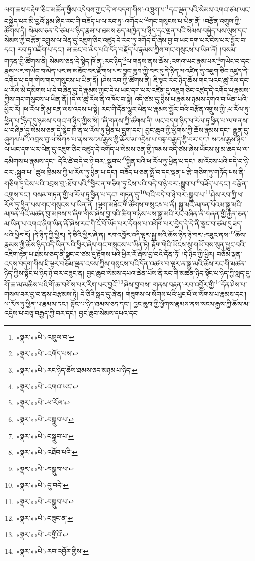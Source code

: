 ལག་ཆས་བརྡེག་ཅིང་མཚོན་གྱིས་འདེབས་ཀྱང་དེ་ལ་བདག་གིས་:འཁྲུག་པ་\footnote{«སྣར་»«པེ་»འཁྲུལ་བ་}དང་ལྡན་པའི་སེམས་འགའ་ཙམ་ཡང་བསྐྱེད་པར་མི་བྱའོ་སྙམ་ཞིང་རང་གི་བཟོད་པ་ལ་རབ་ཏུ་:འགོད་པ་\footnote{«སྣར་»«པེ་»འགོད་པས་}གང་གསུངས་པ་ཡིན་ནོ། །བརྩོན་འགྲུས་ཀྱི་ཚོགས་ནི། སེམས་ཅན་དེ་ཙམ་པ་ཉིད་རྣམ་པ་ཐམས་ཅད་མཁྱེན་པ་ཉིད་དང་ལྡན་པའི་སེམས་བསྐྱེད་པས་ལུས་དང་སེམས་ཀྱི་བརྩོན་འགྲུས་ལ་ལེན་དུ་འཇུག་ཅིང་འཛུད་དེ་རབ་ཏུ་འགོད་དོ་ཞེས་བྱ་བ་ཡང་དག་པར་ངེས་པར་སྦྱོར་བ་དང་། རབ་ཏུ་འཇོག་པ་དང་། མ་ཚང་བ་མེད་པའི་དོན་བརྗོད་པ་རྣམས་ཀྱིས་གང་གསུངས་པ་ཡིན་ནོ། །བསམ་གཏན་གྱི་ཚོགས་ནི། སེམས་ཅན་དེ་སྙེད་ཁོ་ན་:རང་ཉིད་\footnote{«སྣར་»«པེ་»རང་ཉིད་ཆོས་ཐམས་ཅད་མཉམ་པ་ཉིད་}ལ་གནས་ནས་ཆོས་:འགའ་ཡང་རྣམ་པར་\footnote{«སྣར་»«པེ་»འགའ་ཡང་}གཡེང་བ་དང་རྣམ་པར་གཡེང་བ་མེད་པར་མ་མཐོང་བར་རྫོགས་པར་བྱང་ཆུབ་ཀྱི་བར་དུ་དེ་ཉིད་ལ་འཛིན་དུ་འཇུག་ཅིང་འཛུད་དེ་འགོད་པ་དག་གིས་གང་གསུངས་པ་ཡིན་ནོ། །ཤེས་རབ་ཀྱི་ཚོགས་ནི། ཇི་ལྟར་རང་ཉིད་ཆོས་གང་ལའང་ཚུ་རོལ་དང་ཕ་རོལ་མི་དམིགས་པ་དེ་བཞིན་དུ་དེ་རྣམས་ཀྱང་དེ་ལ་ཡང་དག་པར་འཛིན་དུ་འཇུག་ཅིང་འཛུད་དེ་འགོད་པ་རྣམས་ཀྱིས་གང་གསུངས་པ་ཡིན་ནོ། །དེ་ལ་ཚུ་རོལ་ནི་འཁོར་བ་སྟེ། འདི་ཙམ་དུ་བྱིས་པ་རྣམས་ཉམས་དགའ་བ་ཡིན་པའི་ཕྱིར་རོ། །ཕ་རོལ་ནི་མྱ་ངན་ལས་འདས་པ་སྟེ། རང་གི་དོན་ལྷུར་ལེན་པ་རྣམས་སྦྱོར་བའི་བརྩོན་འགྲུས་ཀྱི་:ཕ་རོལ་ཏུ་ཕྱིན་པ་\footnote{«སྣར་»«པེ་»ཕ་རོལ་}ཉིད་དུ་ཉམས་དགའ་བ་ཉིད་ཀྱིས་སོ། །ཞི་གནས་ཀྱི་ཚོགས་ནི། ཡང་བདག་ཉིད་ཕ་རོལ་ཏུ་ཕྱིན་པ་ལ་གནས་པ་བཞིན་དུ་སེམས་ཅན་དེ་སྙེད་ཁོ་ན་ཕ་རོལ་ཏུ་ཕྱིན་པ་དྲུག་དང་། བྱང་ཆུབ་ཀྱི་ཕྱོགས་ཀྱི་ཆོས་རྣམས་དང་། རྒྱུན་དུ་ཞུགས་པའི་འབྲས་བུ་ལ་སོགས་པ་ནས་སངས་རྒྱས་ཀྱི་ཆོས་མ་འདྲེས་པ་བཅྭ་བརྒྱད་ཀྱི་བར་དང་། སངས་རྒྱས་ཉིད་ལ་ཡང་དག་པར་ལེན་དུ་འཇུག་ཅིང་འཛུད་དེ་འགོད་པ་སེམས་ཅན་གྱི་ཁམས་འདི་ཙམ་ཞེས་ཡོངས་སུ་མ་ཆད་པ་ལ་དམིགས་པ་རྣམས་དང་། དེའི་ཚེ་བདེ་བ་ཉེ་བར་:སྒྲུབ་པ་\footnote{«སྣར་»«པེ་»བསྒྲུབ་པ་}སྦྱིན་པའི་ཕ་རོལ་ཏུ་ཕྱིན་པ་དང་། མ་འོངས་པའི་བདེ་བ་ཉེ་བར་:སྒྲུབ་པ་\footnote{«སྣར་»«པེ་»བསྒྲུབ་པ་}ཚུལ་ཁྲིམས་ཀྱི་ཕ་རོལ་ཏུ་ཕྱིན་པ་དང་། བཟོད་པ་ཅན་སྤྲོ་བ་དང་ལྡན་པ་རྩེ་གཅིག་ཏུ་གཏོད་པས་ནི་གཅིག་ཏུ་ངེས་པའི་འབྲས་བུ་:ཐོབ་པའི་\footnote{«སྣར་»«པེ་»འཐོབ་པའི་}ཕྱིར་ན་གཅིག་ཏུ་ངེས་པའི་བདེ་བ་ཉེ་བར་:སྒྲུབ་པ་\footnote{«སྣར་»«པེ་»བསྒྲུབ་པ་}བཟོད་པ་དང་། བརྩོན་འགྲུས་དང་། བསམ་གཏན་གྱི་ཕ་རོལ་ཏུ་ཕྱིན་པ་དང་། གཏན་དུ་\footnote{«སྣར་»«པེ་»དུ་བདེ་}བའི་བདེ་བ་ཉེ་བར་:སྒྲུབ་པ་\footnote{«སྣར་»«པེ་»བསྒྲུབ་པ་}ཤེས་རབ་ཀྱི་ཕ་རོལ་ཏུ་ཕྱིན་པས་གང་གསུངས་པ་ཡིན་ནོ། །ལྷག་མཐོང་གི་ཚོགས་གསུངས་པ་ནི། སྒྱུ་མའི་མཁན་པོའམ་སྒྱུ་མའི་མཁན་པོའི་མཚན་བུ་མཁས་པ་ཞིག་གིས་ཞེས་བྱ་བའི་ཚིག་གཉིས་པས་སྒྱུ་མའི་རང་བཞིན་ནི་གཞན་གྱི་རྐྱེན་ཅན་མ་ཡིན་པ་འགའ་ཞིག་ཡིན་ནོ་ཞེས་རང་གི་ངོ་བོ་ཡོད་པར་དོགས་པ་འགོག་པར་བྱེད་དེ་དེ་ནི་སྣང་བ་ཙམ་དུ་ཟད་པའི་ཕྱིར་རོ། །དེ་ཉིད་ཀྱི་ཕྱིར། དེ་ཅིའི་ཕྱིར་ཞེ་ན། རབ་འབྱོར་འདི་ལྟར་སྒྱུ་མའི་ཆོས་ཉིད་ཉེ་བར་:བཟུང་ནས་\footnote{«སྣར་»«པེ་»བཟུང་ན་}ཆོས་རྣམས་ཀྱི་ཆོས་ཉིད་འདི་ཡིན་པའི་ཕྱིར་ཞེས་གང་གསུངས་པ་ཡིན་ཏེ། རྟོག་གེའི་ཡོངས་སུ་གཡོ་བས་སུན་ཕྱུང་བའི་འཇིག་རྟེན་པ་ཐམས་ཅད་ནི་སྣང་བ་ཙམ་དུ་རྟོགས་པའི་ཕྱིར་རོ་ཞེས་བྱ་བའི་དོན་ཏོ། །དེ་ཉིད་ཀྱི་ཕྱིར། བཅོམ་ལྡན་འདས་བདག་གིས་ཇི་ལྟར་བཅོམ་ལྡན་འདས་ཀྱིས་གསུངས་པའི་དོན་འཚལ་བ་ལྟར་ན་སྒྱུ་མའི་ཆོས་རང་གི་མཚན་ཉིད་ཀྱིས་སྟོང་པ་ཉིད་ཉེ་བར་བཟུང་ན། བྱང་ཆུབ་སེམས་དཔའ་ཆེན་པོས་ནི་རང་གི་མཚན་ཉིད་སྟོང་པ་ཉིད་ཀྱི་སླད་དུ་གོ་ཆ་མ་མཆིས་པའི་གོ་ཆ་བགོས་པར་རིག་པར་བྱའོ་\footnote{«སྣར་»«པེ་»བགྱིའོ་}ཞེས་བྱ་བས། གནས་བརྟན་:རབ་འབྱོར་གྱི་\footnote{«སྣར་»«པེ་»རབ་འབྱོར་གྱིས་}དོན་ཤེས་པ་གསལ་བར་བྱ་བ་ནས་བརྩམས་ཏེ། དེ་ཅིའི་སླད་དུ་ཞེ་ན། གཟུགས་ལ་སོགས་པའི་ཕུང་པོ་ལ་སོགས་པ་རྣམས་དང་། ཕ་རོལ་ཏུ་ཕྱིན་པ་རྣམས་དང་། སྟོང་པ་ཉིད་ཐམས་ཅད་དང་། བྱང་ཆུབ་ཀྱི་ཕྱོགས་རྣམས་ནས་སངས་རྒྱས་ཀྱི་ཆོས་མ་འདྲེས་པ་བཅྭ་བརྒྱད་ཀྱི་བར་དང་། བྱང་ཆུབ་སེམས་དཔའ་དང་། 